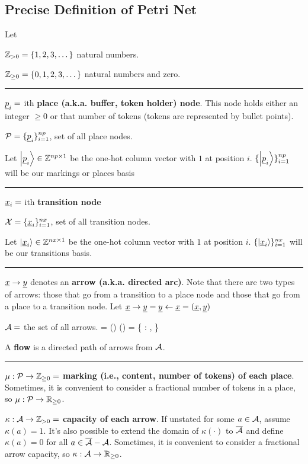 \subsection{Precise Definition of Petri Net}
Let

${\mathbb{Z}}_{>0}= \{1, 2, 3, \dots\}$ natural numbers.

${\mathbb{Z}}_{\geq 0}= \{0, 1, 2, 3, \dots\}$ natural numbers and zero.

\hrule
$\rvp_i =$ ith {\bf place  (a.k.a. buffer, token holder) node}. This node holds either
an integer $\geq 0$ or that number of tokens (tokens are represented by bullet points).

$\calp = \{\rvp_i\}_{i=1}^{np}$, set of all place nodes.


Let $\ket{\rvp_i}\in \ZZ^{np\times 1}$ be the one-hot 
column vector with
$1$ at position $i$. $\{\ket
{\rvp_i}\}_{i=1}^{np}$ will be our {markings or places basis}

\hrule 

$\rvx_i =$ ith {\bf transition node}



$\calx = \{\rvx_i\}_{i=1}^{nx}$, set of all transition nodes.

Let $\ket{\rvx_i}\in \ZZ^{nx\times 1}$ be the one-hot 
column vector with
$1$ at position $i$. $\{\ket
{\rvx_i}\}_{i=1}^{nx}$ will be our {transitions basis}.

\hrule

$\rvx\rarrow \rvy$ denotes an {\bf arrow (a.k.a. directed arc)}. Note that there are two types of arrows:
those that go from a transition to a place node and those that go from a place to
a transition node. Let $\rvx\rarrow\rvy=\rvy\larrow \rvx = (\rvx,\rvy)$

${\cal A} =$  the set of all arrows.
 \beq\cala \subset \ol {\cala} = (\calp \times \calx) \cup (\calx \times \calp) = \{\calp\rarrow\calx {} \calx \rarrow \calp:
\rvp\in\calp, \rvx \in \calx\}\eeq


A {\bf flow} is a directed path of arrows from ${\cal A}$.

\hrule
$\mu : {\cal P} \rightarrow {\mathbb{Z}}_{\geq 0}=$ {\bf marking (i.e., content,
number of tokens) of  each place}. Sometimes, it is convenient to consider a fractional number of tokens in a place, so
$\mu : {\cal P} \rightarrow { \mathbb{R}}_{\geq 0}$.



$\kappa : {\cal A}\rightarrow {\mathbb{Z}}_{>0}=$ {\bf capacity of each arrow}. If unstated for some $a\in {\cal A}$, assume $\kappa(a) = 1$. It's also possible to extend the domain of 
$\kappa(\cdot)$ to $\overline{{\cal A}}$ and define $\kappa(a) = 0$
for all $a\in \overline{{\cal A}}-{\cal A}$. Sometimes, it is convenient to consider a fractional arrow capacity, so
$\kappa : {\cal A} \rightarrow { \mathbb{R}}_{\geq 0}$.

